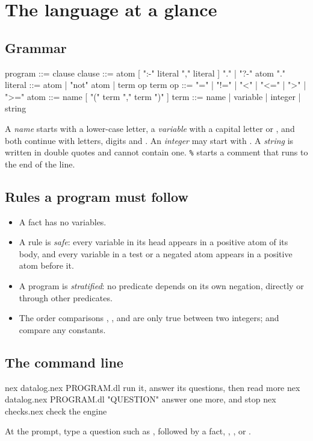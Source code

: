 \chapter{The language at a glance}\label{ch:appendix}

\section{Grammar}

\begin{shell}
program  ::= { clause }
clause   ::= atom [ ":-" literal { "," literal } ] "."
           | "?-" atom "."
literal  ::= atom | "not" atom | term op term
op       ::= "=" | "!=" | "<" | "<=" | ">" | ">="
atom     ::= name [ "(" term { "," term } ")" ]
term     ::= name | variable | integer | string
\end{shell}

A \emph{name} starts with a lower-case letter, a \emph{variable} with a
capital letter or \code{_}, and both continue with letters, digits and
\code{_}. An \emph{integer} may start with \code{-}. A \emph{string} is
written in double quotes and cannot contain one. \texttt{\%} starts a
comment that runs to the end of the line.

\section{Rules a program must follow}

\begin{itemize}
  \item A fact has no variables.
  \item A rule is \emph{safe}: every variable in its head appears in a
    positive atom of its body, and every variable in a test or a negated
    atom appears in a positive atom before it.
  \item A program is \emph{stratified}: no predicate depends on its own
    negation, directly or through other predicates.
  \item The order comparisons \code{<}, \code{<=}, \code{>} and \code{>=}
    are only true between two integers; \code{=} and \code{!=} compare any
    constants.
\end{itemize}

\section{The command line}

\begin{shell}
nex datalog.nex PROGRAM.dl                 run it, answer its questions,
                                           then read more
nex datalog.nex PROGRAM.dl "QUESTION"      answer one more, and stop
nex checks.nex                             check the engine
\end{shell}

At the prompt, type a question such as , 
followed by a fact, , , or .
